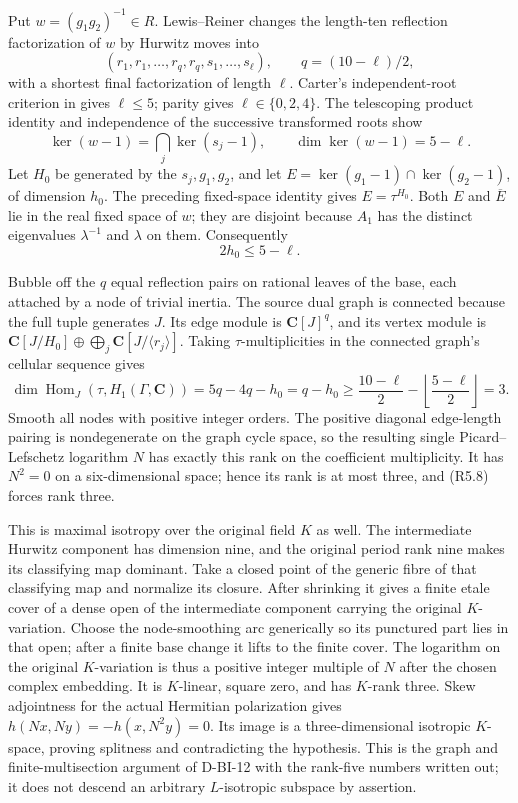 Put $w=(g_1g_2)^{-1}\in R$.  Lewis--Reiner
\cite[Corollary~1.4, p.~1459; proof \S4.3, pp.~1480--1481]{BI:LR}
changes the length-ten reflection factorization of $w$ by Hurwitz
moves into
\[
              (r_1,r_1,\ldots,r_q,r_q,s_1,\ldots,s_\ell),
              \qquad q=(10-\ell)/2,                         \tag{R5.6}
\]
with a shortest final factorization of length $\ell$.
Carter's independent-root criterion in
\cite[Proposition~4.1, p.~1473]{BI:LR} gives $\ell\le5$;
parity gives $\ell\in\{0,2,4\}$.
The telescoping product identity and independence of the successive
transformed roots show
\[
             \ker(w-1)=\bigcap_j\ker(s_j-1),
             \qquad \dim\ker(w-1)=5-\ell.
\]
Let $H_0$ be generated by the $s_j,g_1,g_2$, and let
$E=\ker(g_1-1)\cap\ker(g_2-1)$, of dimension $h_0$.
The preceding fixed-space identity gives $E=\tau^{H_0}$.
Both $E$ and $\overline E$ lie in the real fixed space of $w$;
they are disjoint because $A_1$ has the distinct eigenvalues
$\lambda^{-1}$ and $\lambda$ on them.  Consequently
\[
                         2h_0\le5-\ell.
                                                               \tag{R5.7}
\]

Bubble off the $q$ equal reflection pairs on rational leaves of
the base, each attached by a node of trivial inertia.  The source
dual graph is connected because the full tuple generates $J$.
Its edge module is $\mathbf C[J]^q$, and its vertex module is
$\mathbf C[J/H_0]\oplus\bigoplus_j\mathbf C[J/\langle r_j\rangle]$.
Taking $\tau$-multiplicities in the connected graph's cellular
sequence gives
\[
 \dim\operatorname{Hom}_J(\tau,H_1(\Gamma,\mathbf C))
       =5q-4q-h_0=q-h_0
       \ge\frac{10-\ell}{2}
                      -\left\lfloor\frac{5-\ell}{2}\right\rfloor
       =3.                                                    \tag{R5.8}
\]
Smooth all nodes with positive integer orders.  The positive
diagonal edge-length pairing is nondegenerate on the graph cycle
space, so the resulting single Picard--Lefschetz logarithm $N$
has exactly this rank on the coefficient multiplicity.  It has
$N^2=0$ on a six-dimensional space; hence its rank is at most
three, and (R5.8) forces rank three.

This is maximal isotropy over the original field $K$ as well.
The intermediate Hurwitz component has dimension nine, and the
original period rank nine makes its classifying map dominant.
Take a closed point of the generic fibre of that classifying map
and normalize its closure.  After shrinking it gives a finite
etale cover of a dense open of the intermediate component carrying
the original $K$-variation.  Choose the node-smoothing arc generically
so its punctured part lies in that open; after a finite base change
it lifts to the finite cover.  The logarithm on the original
$K$-variation is thus a positive integer multiple of $N$ after
the chosen complex embedding.  It is $K$-linear, square zero,
and has $K$-rank three.  Skew adjointness for the actual Hermitian
polarization gives
$h(Nx,Ny)=-h(x,N^2y)=0$.
Its image is a three-dimensional isotropic $K$-space, proving
splitness and contradicting the hypothesis.
This is the graph and finite-multisection argument of D-BI-12
with the rank-five numbers written out; it does not descend an
arbitrary $L$-isotropic subspace by assertion.

